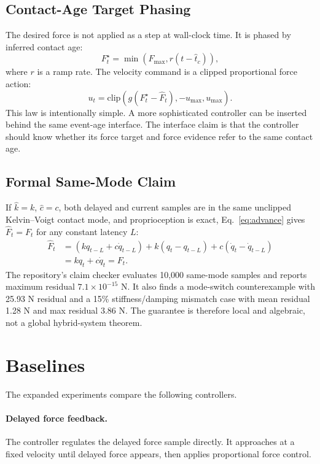 \documentclass{article}
\newcommand{\lat}{L}
\newcommand{\force}{F}
\newcommand{\qpos}{q}
\newcommand{\qvel}{\dot q}
\begin{document}
\subsection{Contact-Age Target Phasing}

The desired force is not applied as a step at wall-clock time. It is phased by inferred contact age:
\begin{equation}
    \force_t^\star=\min(\force_{\max}, r(t-\hat t_c)),
\end{equation}
where $r$ is a ramp rate. The velocity command is a clipped proportional force action:
\begin{equation}
    u_t =
    \mathrm{clip}\left(g(\force_t^\star-\hat\force_t),
    -u_{\max}, u_{\max}\right).
\end{equation}
This law is intentionally simple. A more sophisticated controller can be inserted behind the same event-age interface. The interface claim is that the controller should know whether its force target and force evidence refer to the same contact age.

\subsection{Formal Same-Mode Claim}

If $\hat k=k$, $\hat c=c$, both delayed and current samples are in the same unclipped Kelvin--Voigt contact mode, and proprioception is exact, Eq.~\ref{eq:advance} gives $\hat\force_t=\force_t$ for any constant latency $\lat$:
\begin{align}
\hat \force_t
&= (k\qpos_{t-\lat}+c\qvel_{t-\lat})
 + k(\qpos_t-\qpos_{t-\lat})
 + c(\qvel_t-\qvel_{t-\lat}) \\
&= k\qpos_t+c\qvel_t
 = \force_t .
\end{align}
The repository's claim checker evaluates 10,000 same-mode samples and reports maximum residual $7.1\times10^{-15}$ N. It also finds a mode-switch counterexample with 25.93 N residual and a 15\% stiffness/damping mismatch case with mean residual 1.28 N and max residual 3.86 N. The guarantee is therefore local and algebraic, not a global hybrid-system theorem.

\section{Baselines}

The expanded experiments compare the following controllers.

\paragraph{Delayed force feedback.}
The controller regulates the delayed force sample directly. It approaches at a fixed velocity until delayed force appears, then applies proportional force control.
\end{document}
